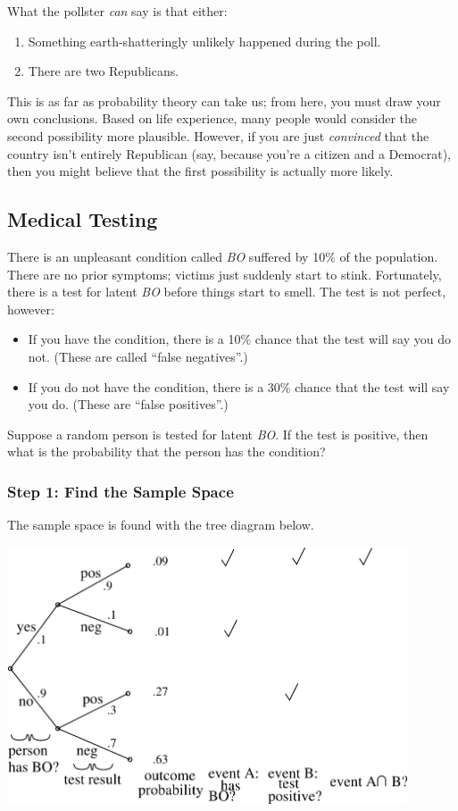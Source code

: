 What the pollster \textit{can} say is that either:
%
\begin{enumerate}
\item Something earth-shatteringly unlikely happened during the poll.
\item There are two Republicans.
\end{enumerate}
%
This is as far as probability theory can take us; from here, you must
draw your own conclusions.  Based on life experience, many people
would consider the second possibility more plausible.  However, if you
are just \textit{convinced} that the country isn't entirely Republican
(say, because you're a citizen and a Democrat), then you might believe
that the first possibility is actually more likely.
\fi


\subsection{Medical Testing}\label{med_test-subsection}

There is an unpleasant condition called \emph{BO} suffered by 10\% of the
population.  There are no prior symptoms; victims just suddenly start to
stink.  Fortunately, there is a test for latent \emph{BO} before things
start to smell.  The test is not perfect, however:
\begin{itemize}

\item If you have the condition, there is a 10\% chance
that the test will say you do not.  (These are called ``false
negatives''.)

\item If you do not have the condition, there is a 30\% chance that the test
will say you do.  (These are ``false positives''.)

\end{itemize}

Suppose a random person is tested for latent \emph{BO}.  If the test is
positive, then what is the probability that the person has the condition?

\subsubsection*{Step 1: Find the Sample Space}

The sample space is found with the tree diagram below.
%
\begin{center}
\includegraphics[height=3in]{figures/BO}
\end{center}

